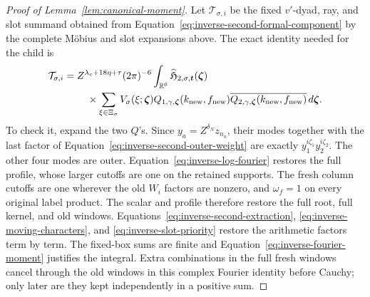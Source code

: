 \documentclass[12pt]{article}
\begin{document}
\begin{proof}[Proof of Lemma~\ref{lem:canonical-moment}]
Let \(\mathcal T_{\sigma,i}\) be the fixed \(v'\)-dyad, ray, and slot
summand obtained from Equation~\eqref{eq:inverse-second-formal-component}
by the complete M\"obius and slot expansions above.  The exact identity
needed for the child is
\begin{equation}\label{eq:inverse-xi-identity}
 \begin{split}
 \mathcal T_{\sigma,i}={}&Z^{\lambda_c+18\eta+\tau}(2\pi)^{-6}
 \int_{\mathbb R^6}\widehat{\mathfrak H}_{2,\sigma,\boldsymbol t}
       (\boldsymbol\zeta)\\
 &\quad\times\sum_{\xi\in\Xi_\sigma}V_\sigma(\xi;\boldsymbol\zeta)
 Q_{1,\gamma,\boldsymbol\zeta}(k_{\rm new},f_{\rm new})
 \overline{Q_{2,\gamma,\boldsymbol\zeta}(k_{\rm new},f_{\rm new})}
 \,d\boldsymbol\zeta.
 \end{split}
\end{equation}
To check it, expand the two \(Q\)'s.  Since
\(y_a=Z^{\delta_N}z_{n_a}\), their modes together with the last
factor of Equation~\eqref{eq:inverse-second-outer-weight} are exactly
\(y_1^{i\zeta_1}y_2^{i\zeta_2}\).  The other four modes are outer.
Equation~\eqref{eq:inverse-log-fourier} restores the full profile,
whose larger cutoffs are one on the retained supports.  The fresh
column cutoffs are one wherever the old \(W_i\) factors are nonzero,
and \(\omega_f=1\) on every original label product.  The scalar and
profile therefore restore the full root, full kernel, and old windows.
Equations~\eqref{eq:inverse-second-extraction},
\eqref{eq:inverse-moving-characters}, and
\eqref{eq:inverse-slot-priority} restore the arithmetic factors term
by term.  The fixed-box sums are finite and
Equation~\eqref{eq:inverse-fourier-moment} justifies the integral.
Extra combinations in the full fresh windows cancel through the old
windows in this complex Fourier identity before Cauchy; only later are
they kept independently in a positive sum.


\end{proof}
\end{document}
